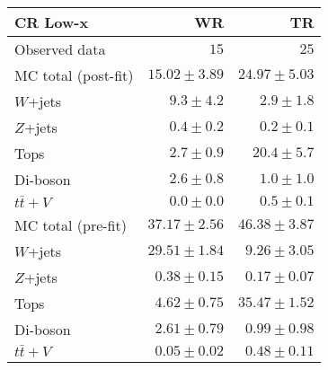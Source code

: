 \begin{table}
  \begin{center}
    \caption{ \label{tab::BGestimation::VRyields_Lowx}   }

    \begin{tabular*}{\textwidth}{@{\extracolsep{\fill}}lrr}
      \toprule
      \textbf{CR Low-x} & WR & TR \\
      \midrule


Observed data & $15$ & $25$ \\
\midrule
\midrule
MC total (post-fit) & $15.02 \pm 3.89$ & $24.97 \pm 5.03$ \\
\midrule
$W$+jets & $9.3 \pm 4.2$ & $2.9 \pm 1.8$ \\
$Z$+jets & $0.4 \pm 0.2$ & $0.2 \pm 0.1$ \\
Tops & $2.7 \pm 0.9$ & $20.4 \pm 5.7$ \\
Di-boson & $2.6 \pm 0.8$ & $1.0 \pm 1.0$ \\
$t\bar{t}+V$ & $0.0 \pm 0.0$ & $0.5 \pm 0.1$ \\
\midrule
\midrule
MC total (pre-fit) & $37.17 \pm 2.56$ & $46.38 \pm 3.87$ \\
\midrule
$W$+jets & $29.51 \pm 1.84$ & $9.26 \pm 3.05$ \\
$Z$+jets & $0.38 \pm 0.15$ & $0.17 \pm 0.07$ \\
Tops & $4.62 \pm 0.75$ & $35.47 \pm 1.52$ \\
Di-boson & $2.61 \pm 0.79$ & $0.99 \pm 0.98$ \\
$t\bar{t}+V$ & $0.05 \pm 0.02$ & $0.48 \pm 0.11$ \\
    \bottomrule
    \end{tabular*}
    
  \end{center}
\end{table}


